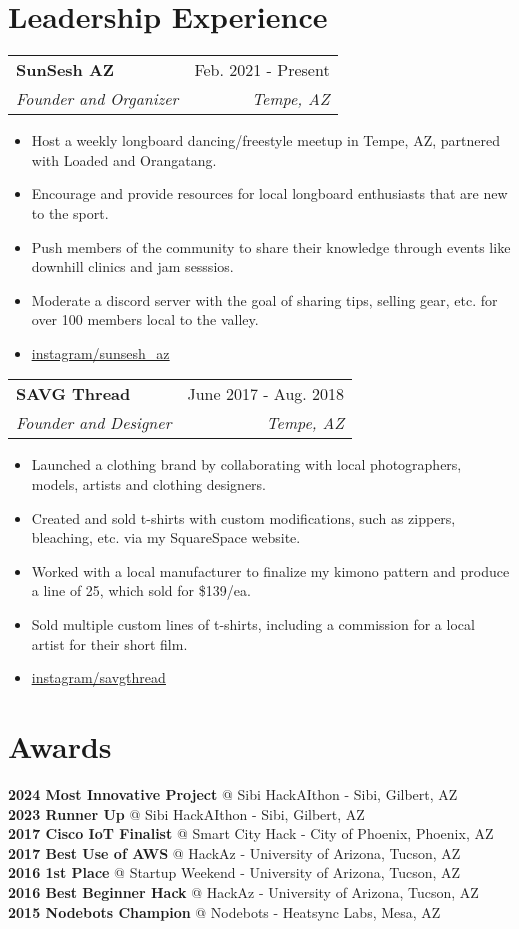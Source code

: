 \documentclass[letterpaper,11pt]{article}
\makeatletter
\newcommand{\resumeItem}[1]{
  \item\small{
    {#1 \vspace{-2pt}}
  }
}
\newcommand{\resumeSubheading}[4]{
  \vspace{-2pt}\item
    \begin{tabular*}{0.97\textwidth}[t]{l@{\extracolsep{\fill}}r}
      \textbf{#1} & #2 \\
      \textit{\small#3} & \textit{\small #4} \\
    \end{tabular*}\vspace{-7pt}
}
\newcommand{\resumeItemListStart}{\begin{itemize}}
\newcommand{\resumeItemListEnd}{\end{itemize}\vspace{-5pt}}
\makeatother
\begin{document}
%
\section{Leadership Experience}
\begin{itemize}[leftmargin=0.15in, label={}]
   \small{\item{
    \resumeSubheading
      {SunSesh AZ}{Feb. 2021 - Present}
      {Founder and Organizer}{Tempe, AZ}
      \resumeItemListStart
        \resumeItem{Host a weekly longboard dancing/freestyle meetup in Tempe, AZ, partnered with Loaded and Orangatang.}
        \resumeItem{Encourage and provide resources for local longboard enthusiasts that are new to the sport.}
        \resumeItem{Push members of the community to share their knowledge through events like downhill clinics and jam sesssios.}
        \resumeItem{Moderate a discord server with the goal of sharing tips, selling gear, etc. for over 100 members local to the valley.}
        \resumeItem{\href{https://www.instagram.com/sunsesh\_az}{\underline{instagram/sunsesh\_az}}}
      \resumeItemListEnd
    \resumeSubheading
      {SAVG Thread}{June 2017 - Aug. 2018}
      {Founder and Designer}{Tempe, AZ}
      \resumeItemListStart
        \resumeItem{Launched a clothing brand by collaborating with local photographers, models, artists and clothing designers.}
        \resumeItem{Created and sold t-shirts with custom modifications, such as zippers, bleaching, etc. via my SquareSpace website.}
        \resumeItem{Worked with a local manufacturer to finalize my kimono pattern and produce a line of 25, which sold for \$139/ea.}
        \resumeItem{Sold multiple custom lines of t-shirts, including a commission for a local artist for their short film.}
        \resumeItem{\href{https://www.instagram.com/savgthread}{\underline{instagram/savgthread}}}
      \resumeItemListEnd
   }}
\end{itemize}

%
\section{Awards}
\begin{itemize}[leftmargin=0.15in, label={}]
   \small{\item{
    \textbf{2024 Most Innovative Project}{ @ Sibi HackAIthon - Sibi, Gilbert, AZ} \\
    \textbf{2023 Runner Up}{ @ Sibi HackAIthon - Sibi, Gilbert, AZ} \\
    \textbf{2017 Cisco IoT Finalist}{ @ Smart City Hack - City of Phoenix, Phoenix, AZ} \\
    \textbf{2017 Best Use of AWS}{ @ HackAz - University of Arizona, Tucson, AZ} \\
    \textbf{2016 1st Place}{ @ Startup Weekend - University of Arizona, Tucson, AZ} \\
    \textbf{2016 Best Beginner Hack}{ @ HackAz - University of Arizona, Tucson, AZ} \\
    \textbf{2015 Nodebots Champion}{ @ Nodebots - Heatsync Labs, Mesa, AZ} \\
   }}
\end{itemize}

\end{document}
